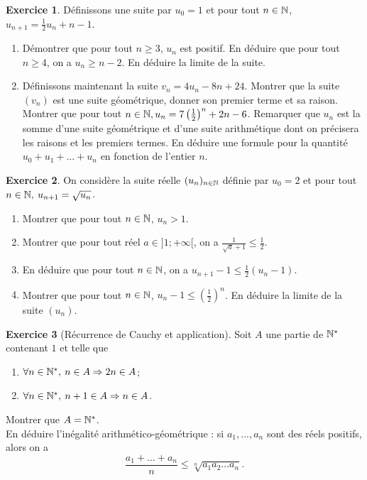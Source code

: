\documentclass[11pt,a4paper]{article}
\theoremstyle{definition}
\newtheorem{exo}{Exercice}
\newcommand{\exercice}[1]{} \newcommand{\finexercice}{}
\newcommand{\enonce}{\begin{exo}} \newcommand{\finenonce}{\end{exo}}
\newcommand{\noindication}{\stepcounter{ind}}
\newcommand{\nocorrection}{\stepcounter{cor}}
\begin{document}
\noindication

\nocorrection

\finexercice
\exercice{7021, megy, 2016/08/25}
\enonce 
Définissons une suite par $u_0=1$ et pour tout $n \in\mathbb{N}$, $u_{n+1} = \frac12 u_n+n-1$. 
\begin{enumerate}
\item Démontrer que pour tout $n\geq 3$, $u_n$ est positif. En déduire que pour tout $n\geq 4$, on a $u_n\geq n-2$. En déduire la limite de la suite.
\item Définissons maintenant la suite $v_n=4u_n-8n+24$. Montrer que la suite $(v_n)$ est une suite géométrique, donner son premier terme et sa raison. Montrer que pour tout $n\in \mathbb{N}, u_n = 7\left(\frac{1}{2}\right)^n+2n-6$. Remarquer que $u_n$ est la somme d'une suite géométrique et d'une suite arithmétique dont on précisera les raisons et les premiers termes. En déduire une formule pour la quantité $u_0+u_1+...+u_n$ en fonction de l'entier $n$.
\end{enumerate}
\finenonce
\noindication
\nocorrection
\finexercice
\exercice{7022, megy, 2016/08/25}

\enonce  
On considère la suite réelle $(u_n)_{n\in\mathbb{N}}$ définie par $u_0=2$ et pour tout $n\in\mathbb{N},\: u_{n+1}=\sqrt{u_n}$.
\begin{enumerate}
\item Montrer que pour tout $n\in\mathbb{N}$, $u_n>1$.
\item Montrer que pour tout réel $a\in]1;+\infty[$, on a $\frac{1}{\sqrt a+1} \leq \frac12$.
\item En déduire que pour tout $n\in\mathbb{N}$, on a $u_{n+1}-1\leq \frac12\left(u_n-1\right)$.
\item Montrer que pour tout $n\in\mathbb{N}$, $u_n-1 \leq \left(\frac12\right)^n$. En déduire la limite de la suite $(u_n)$.
\end{enumerate}
\finenonce

\noindication

\nocorrection

\finexercice

\exercice{7023, megy, 2016/08/25}

\enonce[Récurrence de Cauchy et application]
Soit $A$ une partie de $\mathbb{N}^*$ contenant $1$ et telle que
\begin{enumerate}
\item $\forall n\in \mathbb{N}^*,\: n\in A \Rightarrow 2n \in A$;
\item $\forall n\in \mathbb{N}^*,\: n+1\in A \Rightarrow n \in A$.
\end{enumerate}
Montrer que $A = \mathbb{N}^*$.\\
En déduire l'inégalité arithmético-géométrique : si $a_1, ..., a_n$ sont des réels positifs, alors on a 
\[ \frac{a_1+...+a_n}{n} \leq \sqrt[n]{a_1 a_2  ...   a_n}.\]
\finenonce
\end{document}
